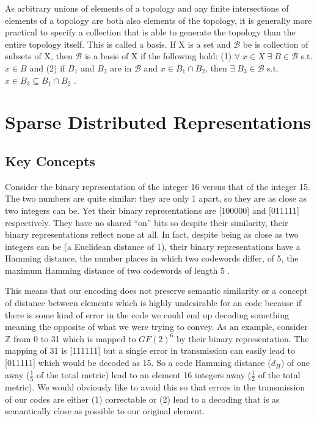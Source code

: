 \documentclass[fleqn,minimal]{article}
\newcommand\blankpage{
	\pagebreak
	\ifthispageodd{\null
		\vfill
		\vfill
		\thispagestyle{empty}
		\clearpage}{}
}
\begin{document}
	As arbitrary unions of elements of a topology and any finite intersections of elements of a topology are both also elements of the topology, it is generally more practical to specify a collection that is able to generate the topology than the entire topology itself. This is called a basis. If X is a set and $\mathcal{B}$ be is collection of subsets of X, then $\mathcal{B}$ is a basis of X if the following hold: (1) $\forall \; x \in X \; \exists \; B \in \mathcal{B}$ s.t. $x \in B$ and (2) if $B_{1}$ and $B_{2}$ are in $\mathcal{B}$ and $x \in B_{1} \cap B_{2}$, then $\exists \; B_{3} \in \mathcal{B}$ s.t. $x \in B_{3} \subseteq B_{1} \cap B_{2}$ \cite{Adams}.
	
	\blankpage
	\section{Sparse Distributed Representations}
	
	\subsection{Key Concepts}
	
	Consider the binary representation of the integer 16 versus that of the integer 15. The two numbers are quite similar: they are only 1 apart, so they are as close as two integers can be. Yet their binary representations are [100000] and [011111] respectively. They have no shared ``on'' bits so despite their similarity, their binary representations reflect none at all. In fact, despite being as close as two integers can be (a Euclidean distance of 1), their binary representations have a Hamming distance, the number places in which two codewords differ, of 5, the maximum Hamming distance of two codewords of length 5 \cite{Adams}. 
	
	This means that our encoding does not preserve semantic similarity or a concept of distance between elements which is highly undesirable for an code because if there is some kind of error in the code we could end up decoding something meaning the opposite of what we were trying to convey. As an example, consider $\mathbb{Z}$ from 0 to 31 which is mapped to $GF(2)^{6}$ by their binary representation. The mapping of 31 is [111111] but a single error in transmission can easily lead to [011111] which would be decoded as 15. So a code Hamming distance ($d_{H}$) of one away ($\frac{1}{5}$ of the total metric) lead to an element 16 integers away ($\frac{1}{2}$ of the total metric). We would obviously like to avoid this so that errors in the transmission of our codes are either (1) correctable or (2) lead to a decoding that is as semantically close as possible to our original element.
	
\end{document}

